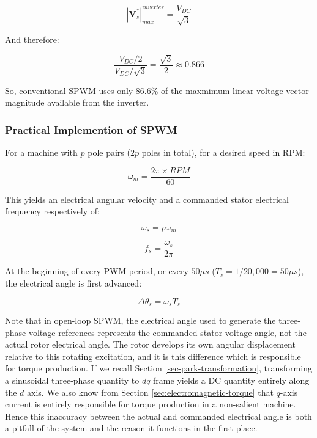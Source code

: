 \documentclass{article}
\begin{document}
\begin{equation}
    |\mathbf{V}_s^*|_{max}^{inverter} = \frac{V_{DC}}{\sqrt{3}}
\end{equation}

And therefore:

\begin{equation}
    \frac{V_{DC}/2}{V_{DC}/\sqrt{3}} = \frac{\sqrt{3}}{2} \approx 0.866
\end{equation}

So, conventional SPWM uses only 86.6\% of the maxmimum linear voltage vector magnitude available from the inverter. 


\subsubsection{Practical Implemention of SPWM}

For a machine with $p$ pole pairs ($2p$ poles in total), for a desired speed in RPM:

\begin{equation}
    \omega_m = \frac{2\pi \times RPM}{60}
\end{equation}

This yields an electrical angular velocity and a commanded stator electrical frequency respectively of:

\begin{equation}
    \omega_s = p\omega_m
\end{equation}

\begin{equation}
    f_s = \frac{\omega_s}{2\pi}
\end{equation}

At the beginning of every PWM period, or every $50\mu s$ ($T_s = 1/20,000 = 50\mu s$), the electrical angle is first advanced:

\begin{equation}
    \Delta\theta_s = \omega_sT_s
\end{equation}

Note that in open-loop SPWM, the electrical angle used to generate the three-phase voltage references represents the commanded stator voltage angle, not the actual rotor electrical angle. The rotor develops its own angular displacement relative to this rotating excitation, and it is this difference which is responsible for torque production. If we recall Section \ref{sec-park-transformation}, transforming a sinusoidal three-phase quantity to $dq$ frame yields a DC quantity entirely along the $d$ axis. We also know from Section \ref{sec:electromagnetic-torque} that $q$-axis current is entirely responsible for torque production in a non-salient machine. Hence this inaccuracy between the actual and commanded electrical angle is both a pitfall of the system and the reason it functions in the first place.
\end{document}
